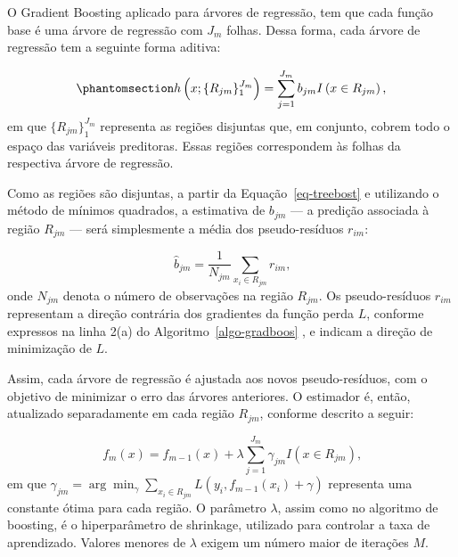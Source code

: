 \documentclass[
  12pt,
  a4paper,
]{scrreprt}
\begin{document}
\vspace{12pt}

O Gradient Boosting aplicado para árvores de regressão, tem que cada
função base é uma árvore de regressão com \(J_m\) folhas. Dessa forma,
cada árvore de regressão tem a seguinte forma aditiva:

\begin{equation}\phantomsection\label{eq-treebost}{
h\left(x;\{R_{jm}\}^{J_{m}}_{1}\right) = \sum^{J_m}_{j = 1} b_{jm} I\left(x \in R_{jm}\right)\text{,}
}\end{equation} em que \(\{R_{jm}\}^{J_m}_{1}\) representa as regiões
disjuntas que, em conjunto, cobrem todo o espaço das variáveis
preditoras. Essas regiões correspondem às folhas da respectiva árvore de
regressão.

\vspace{12pt}

Como as regiões são disjuntas, a partir da Equação~\ref{eq-treebost} e
utilizando o método de mínimos quadrados, a estimativa de \(b_{jm}\) ---
a predição associada à região \(R_{jm}\)\hspace{0pt} --- será
simplesmente a média dos pseudo-resíduos \(r_{im}\):

\[
\hat{b}_{jm} = \frac{1}{N_{jm}} \sum_{x_i \in R_{jm}} r_{im}\text{,}
\] onde \(N_{jm}\) denota o número de observações na região \(R_{jm}\).
Os pseudo-resíduos \(r_{im}\)\hspace{0pt} representam a direção
contrária dos gradientes da função perda \(L\), conforme expressos na
linha 2(a) do  Algoritmo~\ref{algo-gradboos} , e indicam a direção de
minimização de \(L\).

\vspace{12pt}

Assim, cada árvore de regressão é ajustada aos novos pseudo-resíduos,
com o objetivo de minimizar o erro das árvores anteriores. O estimador
é, então, atualizado separadamente em cada região
\(R_{jm}\)\hspace{0pt}, conforme descrito a seguir:

\[
f_m\left(x\right) = f_{m - 1}\left(x\right) + \lambda \sum^{J_m}_{j = 1} \gamma_{jm} I\left(x \in R_{jm}\right)\text{,}
\] em que
\(\gamma_{jm} = \arg \min_{\gamma} \sum_{x_i \in R_{jm}} L\left(y_i, f_{m - 1}\left(x_i\right) + \gamma\right)\)
representa uma constante ótima para cada região. O parâmetro
\(\lambda\), assim como no algoritmo de boosting, é o hiperparâmetro de
shrinkage, utilizado para controlar a taxa de aprendizado. Valores
menores de \(\lambda\) exigem um número maior de iterações \(M\).
\end{document}
